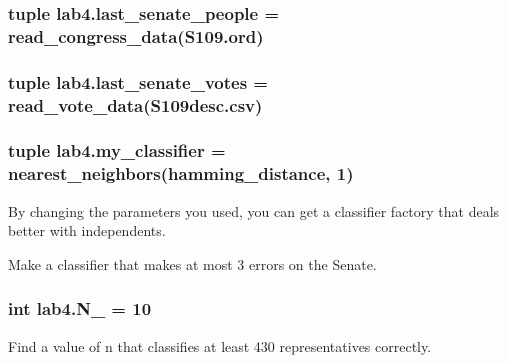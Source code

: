 \hypertarget{namespacelab4_a1ede50f42a59bf83d5c09c3aef93c234}{}
\subsubsection[{last\+\_\+senate\+\_\+people}]{\setlength{\rightskip}{0pt plus 5cm}tuple lab4.\+last\+\_\+senate\+\_\+people = read\+\_\+congress\+\_\+data(\textquotesingle{}S109.\+ord\textquotesingle{})}\label{namespacelab4_a1ede50f42a59bf83d5c09c3aef93c234}
\hypertarget{namespacelab4_a7770c32cb0f0983cb6ae508b479e7a6d}{}
\subsubsection[{last\+\_\+senate\+\_\+votes}]{\setlength{\rightskip}{0pt plus 5cm}tuple lab4.\+last\+\_\+senate\+\_\+votes = read\+\_\+vote\+\_\+data(\textquotesingle{}S109desc.\+csv\textquotesingle{})}\label{namespacelab4_a7770c32cb0f0983cb6ae508b479e7a6d}
\hypertarget{namespacelab4_a00fffafa3b319c7bff473fdf1b6a45e7}{}
\subsubsection[{my\+\_\+classifier}]{\setlength{\rightskip}{0pt plus 5cm}tuple lab4.\+my\+\_\+classifier = nearest\+\_\+neighbors(hamming\+\_\+distance, 1)}\label{namespacelab4_a00fffafa3b319c7bff473fdf1b6a45e7}


By changing the parameters you used, you can get a classifier factory that deals better with independents. 

Make a classifier that makes at most 3 errors on the Senate. \hypertarget{namespacelab4_a950de6b6a30b3a64b09305c0a1f52990}{}
\subsubsection[{N\+\_\+1}]{\setlength{\rightskip}{0pt plus 5cm}int lab4.\+N\+\_ = 10}\label{namespacelab4_a950de6b6a30b3a64b09305c0a1f52990}


Find a value of n that classifies at least 430 representatives correctly. 

